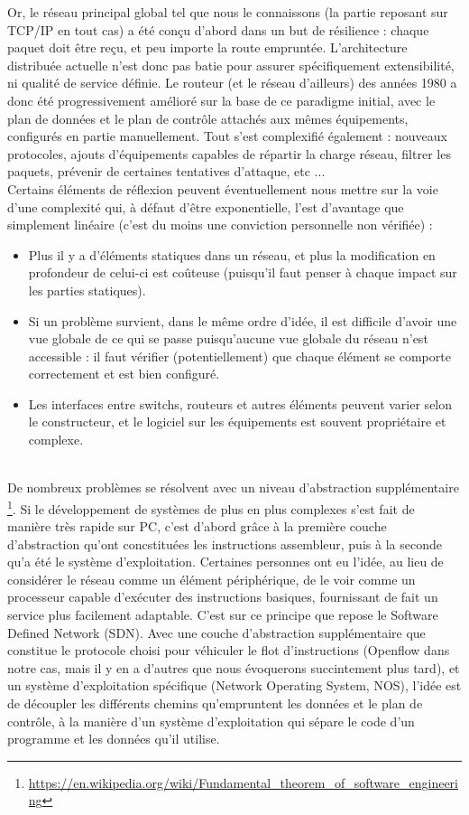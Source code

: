 Or, le réseau principal global tel que nous le connaissons (la partie reposant sur TCP/IP en tout cas) a été conçu d'abord dans un but de résilience : chaque paquet doit être reçu, et peu importe la route empruntée. L'architecture distribuée actuelle n'est donc pas batie pour assurer spécifiquement extensibilité, ni qualité de service définie. Le routeur (et le réseau d'ailleurs) des années 1980 a donc été progressivement amélioré sur la base de ce paradigme initial, avec le plan de données et le plan de contrôle attachés aux mêmes équipements, configurés en partie manuellement. Tout s'est complexifié également : nouveaux protocoles, ajouts d'équipements capables de répartir la charge réseau, filtrer les paquets, prévenir de certaines tentatives d'attaque, etc ...\\
Certains éléments de réflexion peuvent éventuellement nous mettre sur la voie d'une complexité qui, à défaut d'être exponentielle, l'est d'avantage que simplement linéaire (c'est du moins une conviction personnelle non vérifiée) :
\begin{itemize}
\item Plus il y a d'éléments statiques dans un réseau, et plus la modification en profondeur de celui-ci est coûteuse (puisqu'il faut penser à chaque impact sur les parties statiques).
\item Si un problème survient, dans le même ordre d'idée, il est difficile d'avoir une vue globale de ce qui se passe puisqu'aucune vue globale du réseau n'est accessible : il faut vérifier (potentiellement) que chaque élément se comporte correctement et est bien configuré.
\item Les interfaces entre switchs, routeurs et autres éléments peuvent varier selon le constructeur, et le logiciel sur les équipements est souvent propriétaire et complexe.
\end{itemize}
~\\
De nombreux problèmes se résolvent avec un niveau d'abstraction supplémentaire \footnote{\label{indirection}\url{https://en.wikipedia.org/wiki/Fundamental_theorem_of_software_engineering}}. Si le développement de systèmes de plus en plus complexes s'est fait de manière très rapide sur PC, c'est d'abord grâce à la première couche d'abstraction qu'ont concstituées les instructions assembleur, puis à la seconde qu'a été le système d'exploitation. Certaines personnes ont eu l'idée, au lieu de considérer le réseau comme un élément périphérique, de le voir comme un processeur capable d'exécuter des instructions basiques, fournissant de fait un service plus facilement adaptable. C'est sur ce principe que repose le Software Defined Network (SDN). Avec une couche d'abstraction supplémentaire que constitue le protocole choisi pour véhiculer le flot d'instructions (Openflow dans notre cas, mais il y en a d'autres que nous évoquerons succintement plus tard), et un système d'exploitation spécifique (Network Operating System, NOS), l'idée est de découpler les différents chemins qu'empruntent les données et le plan de contrôle, à la manière d'un système d'exploitation qui sépare le code d'un programme et les données qu'il utilise.